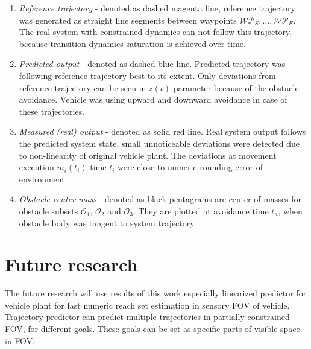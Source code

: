 \begin{enumerate}
    \item \textit{Reference trajectory} - denoted as dashed magenta line, reference trajectory was generated as straight line segments between waypoints $\mathscr{WP}_S,\dots,\mathscr{WP}_E$. The real system with constrained dynamics can not follow this trajectory, because transition dynamics saturation is achieved over time.  
    \item \textit{Predicted output} - denoted as dashed blue line. Predicted trajectory was following reference trajectory best to its extent. Only deviations from reference trajectory can be seen in $z(t)$ parameter because of the obstacle avoidance. Vehicle was using upward and downward avoidance in case of these trajectories.
    \item \textit{Measured (real) output} - denoted as solid red line. Real system output follows the predicted system state, small unnoticeable deviations were detected due to non-linearity of original vehicle plant. The deviations at movement execution $m_i(t_i)$ time $t_i$ were close to numeric rounding error of environment.
    \item \textit{Obstacle center mass} - denoted as black pentagrams are center of masses for obstacle subsets $\mathscr{O}_1$, $\mathscr{O}_2$ and $\mathscr{O}_3$. They are plotted at avoidance time $t_a$, when obstacle body was tangent to system trajectory.
\end{enumerate}

\section{Future research}
\noindent The future research will use results of this work especially linearized predictor for vehicle plant for fast numeric reach set estimation in sensory FOV of vehicle. Trajectory predictor can predict multiple trajectories in partially constrained FOV, for different goals. These goals can be set as specific parts of visible space in FOV.
